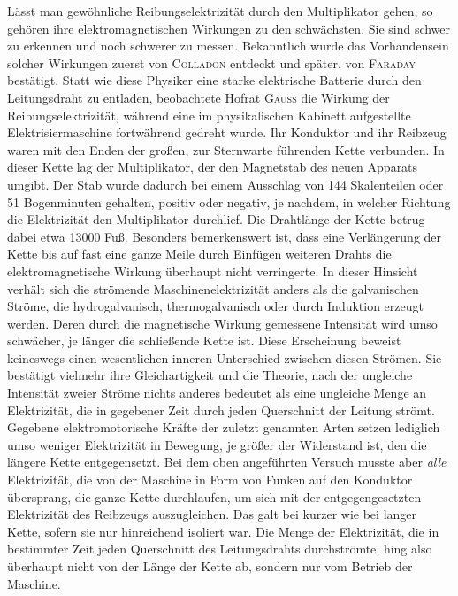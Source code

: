 Lässt man gewöhnliche Reibungselektrizität durch den Multiplikator gehen, so gehören ihre elektromagnetischen Wirkungen zu den schwächsten. Sie sind schwer zu erkennen und noch schwerer zu messen. Bekanntlich wurde das
Vorhandensein solcher Wirkungen zuerst von \textsc{Colladon} entdeckt und später. von \textsc{Faraday} bestätigt. Statt wie diese Physiker eine starke elektrische Batterie durch den Leitungsdraht zu entladen, beobachtete Hofrat \textsc{Gauss} die Wirkung der Reibungselektrizität, während eine im physikalischen Kabinett aufgestellte Elektrisiermaschine fortwährend gedreht wurde. Ihr Konduktor und ihr Reibzeug waren mit den Enden der großen, zur Sternwarte führenden Kette verbunden. In dieser Kette lag der Multiplikator, der den Magnetstab des neuen Apparats umgibt. Der Stab wurde dadurch bei einem Ausschlag von 144 Skalenteilen oder 51 Bogenminuten gehalten, positiv oder negativ, je nachdem, in welcher Richtung die Elektrizität den Multiplikator durchlief. Die Drahtlänge der Kette betrug dabei etwa 13000 Fuß. Besonders bemerkenswert ist, dass eine Verlängerung der Kette bis auf fast eine ganze Meile durch Einfügen weiteren Drahts die elektromagnetische Wirkung überhaupt nicht verringerte. In dieser Hinsicht verhält sich die strömende Maschinenelektrizität anders als die galvanischen Ströme, die hydrogalvanisch, thermogalvanisch oder durch Induktion erzeugt werden. Deren durch die magnetische Wirkung gemessene Intensität wird umso schwächer, je länger die schließende Kette ist. Diese Erscheinung beweist keineswegs einen wesentlichen inneren Unterschied zwischen diesen Strömen. Sie bestätigt vielmehr ihre Gleichartigkeit und die Theorie, nach der ungleiche Intensität zweier Ströme nichts anderes bedeutet als eine ungleiche Menge an Elektrizität, die in gegebener Zeit durch jeden Querschnitt der Leitung strömt. Gegebene elektromotorische Kräfte der zuletzt genannten Arten setzen lediglich umso weniger Elektrizität in Bewegung, je größer der Widerstand ist, den die längere Kette entgegensetzt. Bei dem oben angeführten Versuch musste aber \textit{alle} Elektrizität, die von der Maschine in Form von Funken auf den Konduktor übersprang, die ganze Kette durchlaufen, um sich mit der entgegengesetzten Elektrizität des Reibzeugs auszugleichen. Das galt bei kurzer wie bei langer Kette, sofern sie nur hinreichend isoliert war. Die Menge der Elektrizität, die in bestimmter Zeit jeden Querschnitt des Leitungsdrahts durchströmte, hing also überhaupt nicht von der Länge der Kette ab, sondern nur vom Betrieb der Maschine.

